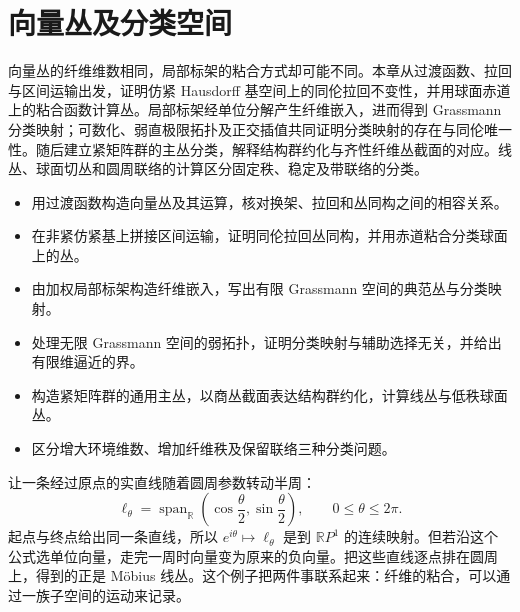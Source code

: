 
% 
% 

\chapter{向量丛及分类空间}
\label{g2:ch:19}

\begin{chapterabstract}
	向量丛的纤维维数相同，局部标架的粘合方式却可能不同。本章从过渡函数、拉回与区间运输出发，证明仿紧 Hausdorff 基空间上的同伦拉回不变性，并用球面赤道上的粘合函数计算丛。局部标架经单位分解产生纤维嵌入，进而得到 Grassmann 分类映射；可数化、弱直极限拓扑及正交插值共同证明分类映射的存在与同伦唯一性。随后建立紧矩阵群的主丛分类，解释结构群约化与齐性纤维丛截面的对应。线丛、球面切丛和圆周联络的计算区分固定秩、稳定及带联络的分类。
\end{chapterabstract}

\begin{learninggoals}
	\begin{itemize}
		\item 用过渡函数构造向量丛及其运算，核对换架、拉回和丛同构之间的相容关系。
		\item 在非紧仿紧基上拼接区间运输，证明同伦拉回丛同构，并用赤道粘合分类球面上的丛。
		\item 由加权局部标架构造纤维嵌入，写出有限 Grassmann 空间的典范丛与分类映射。
		\item 处理无限 Grassmann 空间的弱拓扑，证明分类映射与辅助选择无关，并给出有限维逼近的界。
		\item 构造紧矩阵群的通用主丛，以商丛截面表达结构群约化，计算线丛与低秩球面丛。
		\item 区分增大环境维数、增加纤维秩及保留联络三种分类问题。
	\end{itemize}
\end{learninggoals}

让一条经过原点的实直线随着圆周参数转动半周：
\[
	\ell_\theta=\operatorname{span}_{\mathbb R}
	\left(\cos\frac\theta2,\sin\frac\theta2\right),\qquad 0\le\theta\le2\pi.
\]
起点与终点给出同一条直线，所以 \(e^{i\theta}\mapsto\ell_\theta\) 是到 \(\mathbb RP^1\) 的连续映射。但若沿这个公式选单位向量，走完一周时向量变为原来的负向量。把这些直线逐点排在圆周上，得到的正是 Möbius 线丛。这个例子把两件事联系起来：纤维的粘合，可以通过一族子空间的运动来记录。

